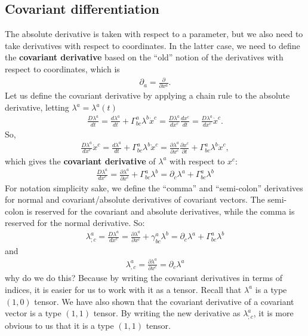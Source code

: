 \documentclass{book}
\theoremstyle{definition}
\begin{document}
\subsection{Covariant differentiation}
The absolute derivative is taken with respect to a parameter, but we also need to take derivatives with respect to coordinates. In the latter case, we need to define the \textbf{covariant derivative} based on the ``old'' notion of the derivatives with respect to coordinates, which is
\begin{align*}
\partial_{a} = \frac{\partial }{\partial x^a}.
\end{align*}
Let us define the covariant derivative by applying a chain rule to the absolute derivative, letting $\lambda^a = \lambda^a(t)$
\begin{align*}
\frac{D\lambda^a}{dt} = \frac{d\lambda^a}{dt} + \Gamma^a_{bc}\lambda^b\dot{x}^c = \frac{D\lambda^a}{dx^c}\frac{dx^c}{dt} = \frac{D\lambda^a}{dx^c}\dot{x}^c.
\end{align*}So,
\begin{align*}
\frac{D\lambda^a}{dx^c}\dot{x}^c = \frac{d\lambda^a}{dt} + \Gamma^a_{bc}\lambda^b\dot{x}^c = \frac{\partial \lambda^a}{\partial x^c}\frac{\partial x^c}{\partial t} + \Gamma^a_{bc}\lambda^b\dot{x}^c, 
\end{align*}
which gives the \textbf{covariant derivative} of $\lambda^a$ with respect to $x^c$:
\begin{align*}
\boxed{\frac{D\lambda^a}{dx^c} = \frac{\partial \lambda^a}{\partial x^c} + \Gamma^a_{bc}\lambda^b = \partial_c\lambda^a + \Gamma^a_{bc}\lambda^b}
\end{align*}
For notation simplicity sake, we define the ``comma'' and ``semi-colon'' derivatives for normal and covariant/absolute derivatives of covariant vectors. The semi-colon is reserved for the covariant and absolute derivatives, while the comma is reserved for the normal derivative. So:
\begin{align*}
\boxed{\lambda^a_{;c} = \frac{D\lambda^a}{dx^c} = \frac{\partial \lambda^a}{\partial x^c} + \gamma^a_{bc}\lambda^b = \partial_c\lambda^a + \Gamma^a_{bc}\lambda^b}
\end{align*}
and
\begin{align*}
\boxed{\lambda^a_{,c} = \frac{\partial \lambda^a}{\partial x^c} = \partial_c\lambda^a}
\end{align*}
why do we do this? Because by writing the covariant derivatives in terms of indices, it is easier for us to work with it as a tensor. Recall that $\lambda^a$ is a type $(1,0)$ tensor. We have also shown that the covariant derivative of a covariant vector is a type $(1,1)$ tensor. By writing the new derivative as $\lambda^a_{;c}$, it is more obvious to us that it is a type $(1,1)$ tensor.\\
\end{document}
